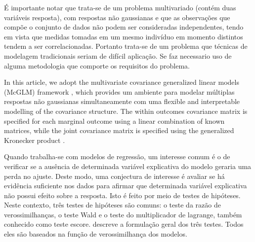 \documentclass[AMA,STIX1COL]{WileyNJD-v2}
\begin{document}
É importante notar que trata-se de um problema multivariado (contém duas variáveis resposta), com respostas não gaussianas e que as observações que compõe o conjunto de dados não podem ser consideradas independentes, tendo em vista que medidas tomadas em um mesmo indivíduo em momento distintos tendem a ser correlacionadas. Portanto trata-se de um problema que técnicas de modelagem tradicionais seriam de difícil aplicação. Se faz necessario uso de alguma metodologia que comporte os requisitos do problema.

In this article, we adopt the multivariate covariance generalized linear models (McGLM) framework \cite{Bonat16}, which provides um ambiente para modelar múltiplas respostas não gaussianas simultaneamente com uma flexible and interpretable modelling of the covariance structure. The within outcomes covariance matrix is specified for each marginal outcome using a linear combination of known matrices, while the joint covariance matrix is specified using the generalized Kronecker product \cite{martinez13,Bonat16}.


Quando trabalha-se com modelos de regressão, um interesse comum é o de verificar se a ausência de determinada variável explicativa do modelo geraria uma perda no ajuste. Deste modo, uma conjectura de interesse é avaliar se há evidência suficiente nos dados para afirmar que determinada variável explicativa não possui efeito sobre a resposta. Isto é feito por meio de testes de hipóteses. Neste contexto, três testes de hipóteses são comuns: o teste da razão de verossimilhanças, o teste Wald e o teste do multiplicador de lagrange, também conhecido como teste escore. \cite{engle} descreve a formulação geral dos três testes. Todos eles são baseados na função de verossimilhança dos modelos. 

\end{document}
